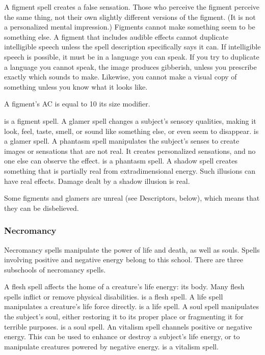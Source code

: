  A figment spell creates a false sensation. Those who perceive the figment perceive the same thing, not their own slightly different versions of the figment. (It is not a personalized mental impression.) Figments cannot make something seem to be something else. A figment that includes audible effects cannot duplicate intelligible speech unless the spell description specifically says it can. If intelligible speech is possible, it must be in a language you can speak. If you try to duplicate a language you cannot speak, the image produces gibberish, unless you prescribe exactly which sounds to make. Likewise, you cannot make a visual copy of something unless you know what it looks like.
\par A figment's AC is equal to 10 \add its size modifier.
\par {} is a figment spell.
 A glamer spell changes a subject's sensory qualities, making it look, feel, taste, smell, or sound like something else, or even seem to disappear.  is a glamer spell.
 A phantasm spell manipulates the subject's senses to create images or sensations that are not real. It creates personalized sensations, and no one else can observe the effect.  is a phantasm spell.
 A shadow spell creates something that is partially real from extradimensional energy. Such illusions can have real effects. Damage dealt by a shadow illusion is real.

 Some figments and glamers are unreal (see Descriptors, below), which means that they can be disbelieved.

\subsubsection{Necromancy}
Necromancy spells manipulate the power of life and death, as well as souls. Spells involving positive and negative energy belong to this school. There are three subschools of necromancy spells.

 A flesh spell affects the home of a creature's life energy: its body. Many flesh spells inflict or remove physical disabilities.  is a flesh spell.
 A life spell manipulates a creature's life force directly.  is a life spell.
 A soul spell manipulates the subject's soul, either restoring it to its proper place or fragmenting it for terrible purposes.  is a soul spell.
 An vitalism spell channels positive or negative energy. This can be used to enhance or destroy a subject's life energy, or to manipulate creatures powered by negative energy.  is a vitalism spell.

